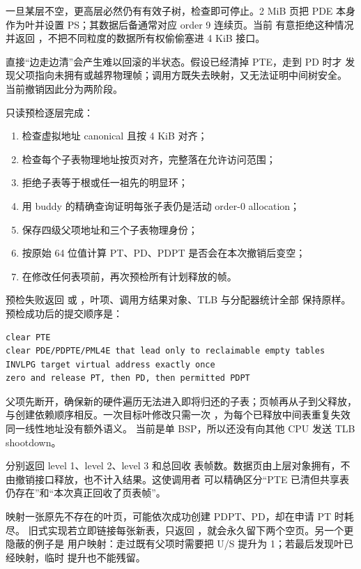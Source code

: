 一旦某层不空，更高层必然仍有有效子树，检查即可停止。2 MiB 页把 PDE 本身
作为叶并设置 PS；其数据后备通常对应 order 9 连续页。当前
 有意拒绝这种情况并返回
，不把不同粒度的数据所有权偷偷塞进 4 KiB
接口。

直接“边走边清”会产生难以回滚的半状态。假设已经清掉 PTE，走到 PD 时才
发现父项指向未拥有或越界物理帧；调用方既失去映射，又无法证明中间树安全。
当前撤销因此分为两阶段。

只读预检逐层完成：

\begin{enumerate}[label=\arabic*.]
  \item 检查虚拟地址 canonical 且按 4 KiB 对齐；
  \item 检查每个子表物理地址按页对齐，完整落在允许访问范围；
  \item 拒绝子表等于根或任一祖先的明显环；
  \item 用 buddy 的精确查询证明每张子表仍是活动 order-0 allocation；
  \item 保存四级父项地址和三个子表物理身份；
  \item 按原始 64 位值计算 PT、PD、PDPT 是否会在本次撤销后变空；
  \item 在修改任何表项前，再次预检所有计划释放的帧。
\end{enumerate}

预检失败返回  或
，叶项、调用方结果对象、TLB 与分配器统计全部
保持原样。预检成功后的提交顺序是：

\begin{verbatim}
clear PTE
clear PDE/PDPTE/PML4E that lead only to reclaimable empty tables
INVLPG target virtual address exactly once
zero and release PT, then PD, then permitted PDPT
\end{verbatim}

父项先断开，确保新的硬件遍历无法进入即将归还的子表；页帧再从子到父释放，
与创建依赖顺序相反。一次目标叶修改只需一次
，为每个已释放中间表重复失效同一线性地址没有额外语义。
当前是单 BSP，所以还没有向其他 CPU 发送 TLB shootdown。

 分别返回 level 1、level 2、level 3 和总回收
表帧数。数据页由上层对象拥有，不由撤销接口释放，也不计入结果。这使调用者
可以精确区分“PTE 已清但共享表仍存在”和“本次真正回收了页表帧”。

映射一张原先不存在的叶页，可能依次成功创建 PDPT、PD，却在申请 PT 时耗尽。
旧式实现若立即链接每张新表，只返回
，就会永久留下两个空页。另一个更隐蔽的例子是
用户映射：走过既有父项时需要把 U/S 提升为 1；若最后发现叶已经映射，临时
提升也不能残留。

